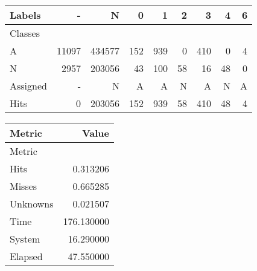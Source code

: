 \begin{tabular}{l|r|r|r|r|r|r|r|r}

Labels &      - &       N &    0 &    1 &   2 &    3 &   4 &  6 \\\hline
Classes  &        &         &      &      &     &      &     &    \\\hline
\hline
A        &  11097 &  434577 &  152 &  939 &   0 &  410 &   0 &  4 \\\hline
N        &   2957 &  203056 &   43 &  100 &  58 &   16 &  48 &  0 \\\hline
\hline
Assigned &      - &       N &    A &    A &   N &    A &   N &  A \\\hline
Hits     &      0 &  203056 &  152 &  939 &  58 &  410 &  48 &  4 
\end{tabular}
\begin{tabular}{l|r}

Metric   &       Value \\\hline
Metric   &             \\\hline
\hline
Hits     &    0.313206 \\\hline
Misses   &    0.665285 \\\hline
Unknowns &    0.021507 \\\hline
Time     &  176.130000 \\\hline
System   &   16.290000 \\\hline
Elapsed  &   47.550000 
\end{tabular}
